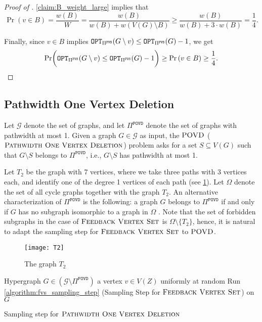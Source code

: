 \documentclass[letterpaper,11pt]{article}
\newcommand{\1}[1]{\mathds{1}\left[#1\right]}
\newcommand{\OPT}{\textnormal{\texttt{OPT}}}
\newcommand{\fvsPi}{\Pi^{\texttt{FVS}}}
\newcommand{\povdPi}{\Pi^{\texttt{POVD}}}
\newcommand{\fvs}{\textsc{Feedback Vertex Set}\xspace}
\newcommand{\povd}{\textsc{Pathwidth One Vertex Deletion}\xspace}
\newcommand{\spovd}{\textsc{POVD}\xspace}
\begin{document}
\begin{proof}[Proof of ]
	\cref{claim:B_weight_large} implies that
	\begin{equation*}
		\Pr\left( v \in B \right) = \frac{w(B)}{W} = \frac{w(B)}{w(B) + w\left( V(G) \setminus B \right) } \geq \frac{w(B)}{w(B) + 3\cdot w(B)} = \frac{1}{4}.
	\end{equation*}

	Finally, since $v \in B$ implies $\OPT_{\fvsPi}(G \setminus v) \leq \OPT_{\fvsPi}(G) - 1$,
	we get
	\begin{equation*}
		\Pr\biggl(\OPT_{\fvsPi}(G \setminus v) \leq \OPT_{\fvsPi}(G) - 1\biggr) \geq \Pr\left( v \in B \right) \geq \frac{1}{4}.
	\end{equation*}
\end{proof}

 
\subsection{Pathwidth One Vertex Deletion}
\label{sec:povd}

Let $\mathcal{G}$ denote the set of graphs,
and let $\povdPi$ denote the set of graphs with pathwidth at most 1. Given a graph
$G \in \mathcal{G}$ as input, the $\spovd$ ($\povd$) problem asks for a set
$S \subseteq V(G)$ such that $G \setminus S$ belongs to $\povdPi$, i.e., $G
\setminus S$ has pathwidth at most 1.

Let $T_2$ be the graph with 7 vertices, where we take three paths with 3 vertices each,
and identify one
of the degree 1 vertices of each path (see \cref{fig:T2}).
Let $\Omega$ denote the set of all cycle graphs together with the graph $T_2$.
An alternative characterization of $\povdPi$ is the following: a graph $G$
belongs to $\povdPi$ if and only if $G$ has no subgraph isomorphic to a graph in
$\Omega$ \cite{philipQuarticKernelPathwidthOne2010,
tsurFasterAlgorithmPathwidth2022}.
Note that the set of forbidden subgraphs in the case of $\fvs$ is $\Omega \setminus \{T_2\}$,
hence, it is natural to adapt the sampling step for $\fvs$ to $\spovd$.


\begin{figure}[htpb]
	\centering
	\texttt{[image: T2]}
	\caption{The graph $T_2$}
	\label{fig:T2}
\end{figure}



\begin{algorithm}
	\begin{algorithmic}[1]
		\Input Hypergraph $G \in \left( \mathcal{G} \setminus \povdPi \right) $
			\State \Return a vertex $v \in V(Z)$ uniformly at random \label{line:T2}
		\ElsIf
			\State \;Run \cref{algorithm:fvs_sampling_step} (Sampling Step for $\fvs$) on $G$
		\EndIf
	\end{algorithmic}
	\caption{Sampling step for $\povd$}\label{algorithm:povd_sampling_step}
\end{algorithm}
\end{document}
